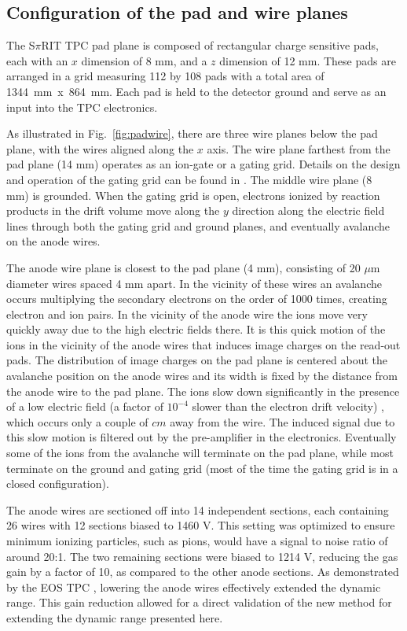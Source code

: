 \documentclass[review,number,sort&compress]{elsarticle}
\begin{document}
\subsection{Configuration of the pad and wire planes} 
The S$\pi$RIT TPC pad plane is composed of rectangular charge sensitive pads, each with an $x$ dimension of 8 mm, and a $z$ dimension of 12 mm. These pads are arranged in a grid measuring 112 by 108 pads with a total area of 1344~mm~x~864~mm. Each pad is held to the detector ground and serve as an input into the TPC electronics. 

As illustrated in Fig.~\ref{fig:padwire}, there are three wire planes below the pad plane, with the wires aligned along the $x$ axis. The wire plane farthest from the pad plane (14 mm) operates as an ion-gate or a gating grid. Details on the design and operation of the gating grid can be found in \cite{suwat}. The middle wire plane (8~ mm) is grounded. When the gating grid is open, electrons ionized by reaction products in the drift volume move along the $y$ direction along the electric field lines through both the gating grid and ground planes, and eventually avalanche on the anode wires. 

The anode wire plane is closest to the pad plane (4 mm), consisting of 20 $\mu$m diameter wires spaced 4 mm apart. In the vicinity of these wires an avalanche occurs multiplying the secondary electrons on the order of 1000 times, creating electron and ion pairs. In the vicinity of the anode wire the ions move very quickly away due to the high electric fields there. It is this quick motion of the ions in the vicinity of the anode wires that induces image charges on the read-out pads. The distribution of image charges on the pad plane is centered about the avalanche position on the anode wires and its width is fixed by the distance from the anode wire to the pad plane. The ions slow down significantly in the presence of a low electric field (a factor of $10^{-4}$ slower than the electron drift velocity) \citep{blumrol}, which occurs only a couple of $cm$ away from the wire. The induced signal due to this slow motion is filtered out by the pre-amplifier in the electronics. Eventually some of the ions from the avalanche will terminate on the pad plane, while most terminate on the ground and gating grid (most of the time the gating grid is in a closed configuration).



The anode wires are sectioned off into 14 independent sections, each containing 26 wires with 12 sections biased to 1460 V. This setting was optimized to ensure minimum ionizing particles, such as pions, would have a signal to noise ratio of around 20:1. The two remaining sections were biased to 1214 V, reducing the gas gain by a factor of 10, as compared to the other anode sections. As demonstrated by the EOS TPC \citep{eos}, lowering the anode wires effectively extended the dynamic range.  This gain reduction allowed for a direct validation of the new method for extending the dynamic range presented here. 
\end{document}
